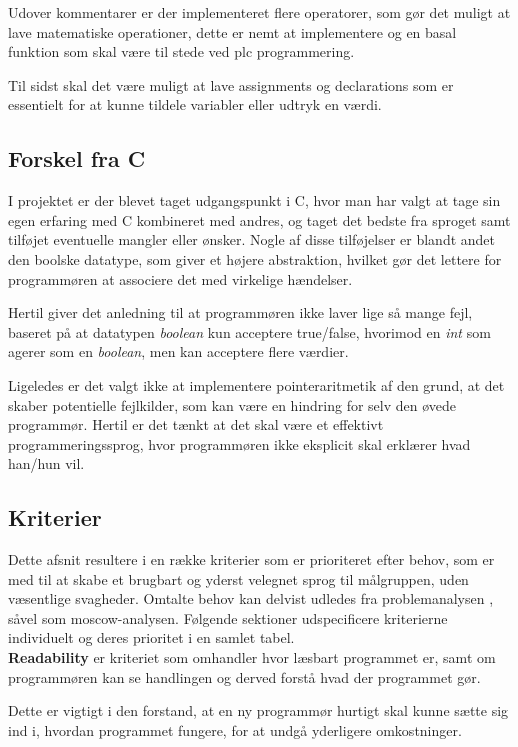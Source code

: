 Udover kommentarer er der implementeret flere operatorer, som gør det muligt at lave matematiske operationer, dette er nemt at implementere og en basal funktion som skal være til stede ved \gls{plc} programmering.

Til sidst skal det være muligt at lave assignments og declarations som er essentielt for at kunne tildele variabler eller udtryk en værdi.

\subsection{Forskel fra C}
\label{sec:forskelfrac}
I projektet er der blevet taget udgangspunkt i C, hvor man har valgt at tage sin egen erfaring med C kombineret med andres, og taget det bedste fra sproget samt tilføjet eventuelle mangler eller ønsker.
Nogle af disse tilføjelser er blandt andet den boolske datatype, som giver et højere abstraktion, hvilket gør det  lettere for programmøren at associere det med virkelige hændelser.

Hertil giver det anledning til at programmøren ikke laver lige så mange fejl, baseret på at datatypen \textit{boolean} kun acceptere true/false, hvorimod en \textit{int} som agerer som en \textit{boolean}, men kan acceptere flere værdier.

Ligeledes er det valgt ikke at implementere pointeraritmetik af den grund, at det skaber potentielle fejlkilder, som kan være en hindring for selv den øvede programmør. Hertil er det tænkt at det skal være et effektivt programmeringssprog, hvor programmøren ikke eksplicit skal erklærer hvad han/hun vil.

\subsection{Kriterier}
Dette afsnit resultere i en række kriterier som er prioriteret efter behov, som er med til at skabe et brugbart og yderst velegnet sprog til målgruppen, uden væsentlige svagheder. Omtalte behov kan delvist udledes fra problemanalysen , såvel som \gls{moscow}-analysen.
Følgende sektioner udspecificere kriterierne individuelt og deres prioritet i en samlet tabel.\\

\noindent\textbf{Readability} er kriteriet som omhandler hvor læsbart programmet er, samt om programmøren kan se handlingen og derved forstå hvad der programmet gør.

Dette er vigtigt i den forstand, at en ny programmør hurtigt skal kunne sætte sig ind i, hvordan programmet fungere, for at undgå yderligere omkostninger. 


